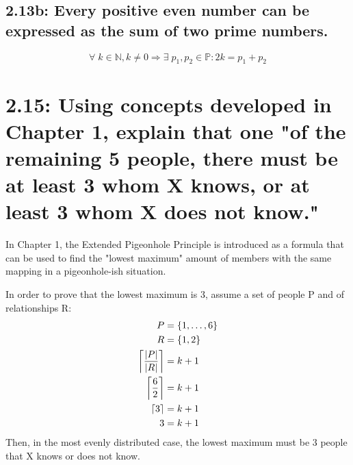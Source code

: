 \documentclass{article}
\DeclarePairedDelimiter{\ceil}{\lceil}{\rceil}
\begin{document}
\subsection*{2.13b: Every positive even number can be expressed as the sum of two prime numbers.}

\begin{equation*}
  \forall\;k\in\mathbb{N},k\neq0\Rightarrow\exists\;p_1,p_2\in\mathbb{P}:2k=p_1+p_2 
\end{equation*}

\section*{2.15: Using concepts developed in Chapter 1, explain that one "of the remaining 5 people, there must be at least 3 whom X knows, or at least 3 whom X does not know."}

In Chapter 1, the Extended Pigeonhole Principle is introduced as a formula that can be used to find the "lowest maximum" amount of members with the same mapping in a pigeonhole-ish situation.

In order to prove that the lowest maximum is 3, assume a set of people P and of relationships R:
\begin{align*}
  P&=\{1,\ldots,6\}\\
  R&=\{1, 2\}\\
  \ceil*{\frac{|P|}{|R|}}&=k+1\\
  \ceil*{\frac{6}{2}}&=k+1\\
  \ceil*{3}&=k+1\\
  3&=k+1
\end{align*}
Then, in the most evenly distributed case, the lowest maximum must be 3 people that X knows or does not know.
\end{document}
